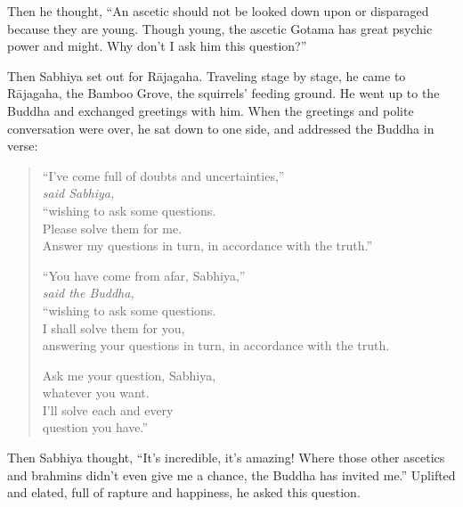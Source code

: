 \documentclass[12pt,openany]{book}%
\newcommand*{\scspeaker}[1]{\hspace{2em}\textit{#1}}
\begin{document}
Then he thought, “An ascetic should not be looked down upon or disparaged because they are young. Though young, the ascetic Gotama has great psychic power and might. Why don’t I ask him this question?” 

Then Sabhiya set out for \textsanskrit{Rājagaha}. Traveling stage by stage, he came to \textsanskrit{Rājagaha}, the Bamboo Grove, the squirrels’ feeding ground. He went up to the Buddha and exchanged greetings with him. When the greetings and polite conversation were over, he sat down to one side, and addressed the Buddha in verse: 

\begin{verse}%
“I’ve come full of  doubts and uncertainties,” \\
\scspeaker{said Sabhiya, }\\
“wishing to ask some questions. \\
Please solve them for me. \\
Answer my questions in turn, in accordance with the truth.” 

“You have come from afar, Sabhiya,” \\
\scspeaker{said the Buddha, }\\
“wishing to ask some questions. \\
I shall solve them for you, \\
answering your questions in turn, in accordance with the truth. 

Ask me your question, Sabhiya, \\
whatever you want. \\
I’ll solve each and every \\
question you have.” 

%
\end{verse}

Then Sabhiya thought, “It’s incredible, it’s amazing! Where those other ascetics and brahmins didn’t even give me a chance, the Buddha has invited me.” Uplifted and elated, full of rapture and happiness, he asked this question. 
\end{document}
